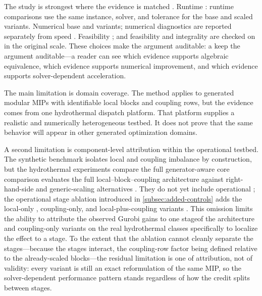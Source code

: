 \documentclass[AMA,Times1COL]{WileyNJDv5} %
\providecommand{\DIFadd}[1]{{\protect\color{blue} \sf #1}} %
\providecommand{\DIFdel}[1]{{\protect\color{red} \scriptsize #1}} %
\providecommand{\DIFaddbegin}{} %
\providecommand{\DIFaddend}{} %
\providecommand{\DIFdelbegin}{} %
\providecommand{\DIFdelend}{} %
\begin{document}
The study is strongest where the evidence is matched\DIFdelbegin \DIFdel{. Runtime }\DIFdelend \DIFaddbegin \DIFadd{: runtime }\DIFaddend comparisons use the same
instance, solver, and tolerance for \DIFdelbegin \DIFdel{the base and scaled variants. Numerical }\DIFdelend \DIFaddbegin \DIFadd{base and variants; numerical }\DIFaddend diagnostics are reported
separately from speed\DIFdelbegin \DIFdel{. Feasibility }\DIFdelend \DIFaddbegin \DIFadd{; and feasibility }\DIFaddend and integrality are checked \DIFdelbegin \DIFdel{on }\DIFdelend \DIFaddbegin \DIFadd{in }\DIFaddend the original scale. These
choices \DIFdelbegin \DIFdel{make the argument auditable: a }\DIFdelend \DIFaddbegin \DIFadd{keep the argument auditable---a }\DIFaddend reader can see which evidence supports algebraic
equivalence, which \DIFdelbegin \DIFdel{evidence }\DIFdelend supports numerical improvement, and which \DIFdelbegin \DIFdel{evidence
}\DIFdelend supports solver-dependent
acceleration.

The main limitation is domain coverage. The method applies to generated modular MIPs with
identifiable local blocks and coupling rows, but the evidence comes from one hydrothermal
dispatch platform. That platform supplies a realistic and numerically heterogeneous
testbed. It does not prove that the same behavior will appear in other generated
optimization domains.

A second limitation is component-level attribution within the operational testbed. The
\DIFdelbegin \DIFdel{synthetic benchmark isolates local and coupling imbalance by construction, but the hydrothermal experiments compare the full generator-aware }\DIFdelend \DIFaddbegin \DIFadd{core comparison evaluates the full local--block--coupling }\DIFaddend architecture against
right-hand-side and generic-scaling alternatives\DIFdelbegin \DIFdel{. They do not yet include operational }\DIFdelend \DIFaddbegin \DIFadd{; the operational stage ablation introduced
in \cref{subsec:added-controls} adds the }\DIFaddend local-only \DIFdelbegin \DIFdel{, coupling-only, and local-plus-coupling variants . This omission limits the ability to attribute the observed Gurobi gains to one stageof the architecture}\DIFdelend \DIFaddbegin \DIFadd{and coupling-only variants on the real
hydrothermal classes specifically to localize the effect to a stage. To the extent that the
ablation cannot cleanly separate the stages---because the stages interact, the coupling-row
factor being defined relative to the already-scaled blocks---the residual limitation is one
of attribution, not of validity: every variant is still an exact reformulation of the same
MIP, so the solver-dependent performance pattern stands regardless of how the credit splits
between stages.
}
\end{document}

